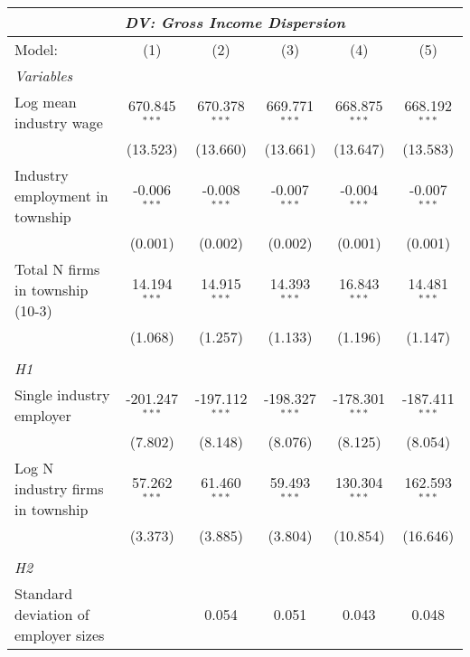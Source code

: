 \begingroup
\centering
\begin{tabular}{lccccc}
   \tabularnewline \multicolumn{6}{c}{\textit{DV: Gross Income Dispersion}} \\ \midrule \midrule
   Model:                               & (1)              & (2)              & (3)              & (4)              & (5)\\  
   \midrule
   \emph{Variables}\\
   Log mean industry wage               & 670.845$^{***}$  & 670.378$^{***}$  & 669.771$^{***}$  & 668.875$^{***}$  & 668.192$^{***}$\\   
                                        & (13.523)         & (13.660)         & (13.661)         & (13.647)         & (13.583)\\   
   Industry employment in township      & -0.006$^{***}$   & -0.008$^{***}$   & -0.007$^{***}$   & -0.004$^{***}$   & -0.007$^{***}$\\   
                                        & (0.001)          & (0.002)          & (0.002)          & (0.001)          & (0.001)\\   
   Total N firms in township (10-3)     & 14.194$^{***}$   & 14.915$^{***}$   & 14.393$^{***}$   & 16.843$^{***}$   & 14.481$^{***}$\\   
                                        & (1.068)          & (1.257)          & (1.133)          & (1.196)          & (1.147)\\   
\hdashline %
\\[0.1ex] %
\emph{H1} \\ 
   Single industry employer             & -201.247$^{***}$ & -197.112$^{***}$ & -198.327$^{***}$ & -178.301$^{***}$ & -187.411$^{***}$\\   
                                        & (7.802)          & (8.148)          & (8.076)          & (8.125)          & (8.054)\\   
   Log N industry firms in township     & 57.262$^{***}$   & 61.460$^{***}$   & 59.493$^{***}$   & 130.304$^{***}$  & 162.593$^{***}$\\   
                                        & (3.373)          & (3.885)          & (3.804)          & (10.854)         & (16.646)\\   
\hdashline %
\\[0.1ex] %
\emph{H2} \\ 
   Standard deviation of employer sizes &                  & 0.054            & 0.051            & 0.043            & 0.048\\   

\end{tabular}
